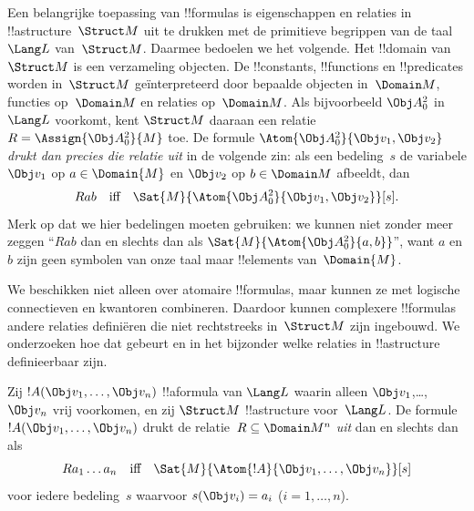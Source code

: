 \documentclass[openany]{memoir}
\begin{document}
\begingroup
\def\olfilename{OLP-0171}
\def\olfilepath{content/first-order-logic/models-theories/}
\hypertarget{unit-OLP-0171}{}





\begin{explain}
Een belangrijke toepassing van !!{formula}s is eigenschappen en
relaties in !!a{structure}~$\Struct M$ uit te drukken met de
primitieve begrippen van de taal~$\Lang L$ van~$\Struct M$. Daarmee
bedoelen we het volgende. Het !!{domain} van $\Struct M$ is een
verzameling objecten. De !!{constant}s, !!{function}s en
!!{predicate}s worden in~$\Struct M$ geïnterpreteerd door bepaalde
objecten in~$\Domain M$, functies op~$\Domain M$ en relaties
op~$\Domain M$. Als bijvoorbeeld $\Obj A^2_0$ in $\Lang L$ voorkomt,
kent $\Struct M$ daaraan een relatie~$R = \Assign{{\Obj
  A^2_0}}{M}$ toe. De formule $\Atom{\Obj A^2_0}{\Obj v_1, \Obj v_2}$
\emph{drukt dan precies die relatie uit} in de volgende zin:
als een bedeling~$s$ de variabele $\Obj v_1$ op $a \in \Domain{M}$ en
$\Obj v_2$ op $b \in \Domain M$ afbeeldt, dan
\[
Rab \text{\quad iff\quad} \Sat{M}{\Atom{\Obj A^2_0}{\Obj v_1, \Obj v_2}}[s].
\]
Merk op dat we hier bedelingen moeten gebruiken: we kunnen niet zonder
meer zeggen ``$Rab$ dan en slechts dan als
$\Sat{M}{\Atom{\Obj A^2_0}{a, b}}$'', want $a$ en $b$ zijn geen
symbolen van onze taal maar !!{element}s van~$\Domain{M}$.

We beschikken niet alleen over atomaire !!{formula}s, maar kunnen ze
met logische connectieven en kwantoren combineren. Daardoor kunnen
complexere !!{formula}s andere relaties definiëren die niet
rechtstreeks in~$\Struct M$ zijn ingebouwd. We onderzoeken hoe dat
gebeurt en in het bijzonder welke relaties in !!a{structure}
definieerbaar zijn.
\end{explain}

\begin{defn}
Zij $!A(\Obj v_1,\dots, \Obj v_n)$ !!a{formula} van $\Lang L$ waarin
alleen $\Obj v_1$,\dots, $\Obj v_n$ vrij voorkomen, en zij $\Struct M$
!!a{structure} voor~$\Lang L$. De formule
$!A(\Obj v_1,\dots, \Obj v_n)$ drukt de relatie~$R \subseteq
\Domain M^n$ \emph{uit} dan en slechts dan als
\[
Ra_1\dots a_n \text{\quad iff\quad} \Sat{M}{\Atom{!A}{\Obj
    v_1,\dots, \Obj v_n}}[s]
\]
voor iedere bedeling~$s$ waarvoor $s(\Obj v_i) = a_i$ ($i = 1,
\dots, n$).
\end{defn}
\end{document}
